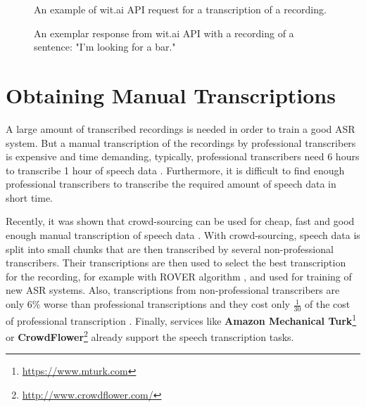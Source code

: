 \begin{figure}[h]
  

  \caption{An example of wit.ai API request for a transcription of a recording.}
  \label{fig:wit-ai-request}
\end{figure}

\begin{figure}[h]
  

  \caption{An exemplar response from wit.ai API with a recording of a sentence: "I'm looking for a bar."}
  \label{fig:wit-ai-response}
\end{figure}


\section{Obtaining Manual Transcriptions}
A large amount of transcribed recordings is needed in order to train a good ASR system.
But a manual transcription of the recordings by professional transcribers is expensive and time demanding,
  typically, professional transcribers need 6 hours to transcribe 1 hour of speech data \cite{williams2011crowd}.
Furthermore, it is difficult to find enough professional transcribers to transcribe the required amount of speech data in short time.

Recently, it was shown that crowd-sourcing can be used for cheap, fast and good enough manual transcription of speech data \cite{novotney2010cheap}.
With crowd-sourcing, speech data is split into small chunks that are then transcribed by several non-professional transcribers.
Their transcriptions are then used to select the best transcription for the recording, for example with ROVER algorithm \cite{marge2010using}, and used for training of new ASR systems.
Also, transcriptions from non-professional transcribers are only $6\%$ worse than professional transcriptions
  and they cost only $\frac{1}{30}$ of the cost of professional transcription \cite{novotney2010cheap}.
Finally, services like \textbf{Amazon Mechanical Turk}\footnote{\url{https://www.mturk.com}}
  or \textbf{CrowdFlower}\footnote{\url{http://www.crowdflower.com/}} already support the speech transcription tasks.
